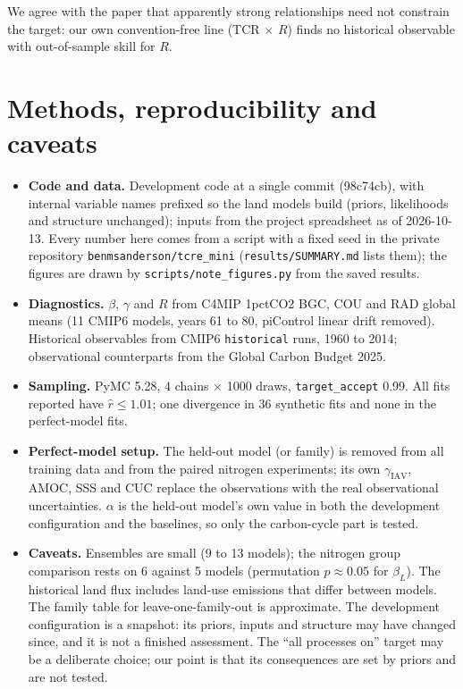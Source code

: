 \documentclass[11pt,a4paper]{article}
\newcommand{\bL}{$\beta_L$}
\begin{document}
We agree with the paper that apparently strong relationships need not constrain the target: our own convention-free line (TCR $\times$ $R$) finds no historical observable with out-of-sample skill for $R$.

\section*{Methods, reproducibility and caveats}

\begin{itemize}
\item \textbf{Code and data.} Development code at a single commit (98c74cb), with internal variable names prefixed so the land models build (priors, likelihoods and structure unchanged); inputs from the project spreadsheet as of 2026-10-13. Every number here comes from a script with a fixed seed in the private repository \texttt{benmsanderson/tcre\_mini} (\texttt{results/SUMMARY.md} lists them); the figures are drawn by \texttt{scripts/note\_figures.py} from the saved results.
\item \textbf{Diagnostics.} $\beta$, $\gamma$ and $R$ from C4MIP 1pctCO2 BGC, COU and RAD global means (11 CMIP6 models, years 61 to 80, piControl linear drift removed). Historical observables from CMIP6 \texttt{historical} runs, 1960 to 2014; observational counterparts from the Global Carbon Budget 2025.
\item \textbf{Sampling.} PyMC 5.28, 4 chains $\times$ 1000 draws, \texttt{target\_accept} 0.99. All fits reported have $\hat r \le 1.01$; one divergence in 36 synthetic fits and none in the perfect-model fits.
\item \textbf{Perfect-model setup.} The held-out model (or family) is removed from all training data and from the paired nitrogen experiments; its own $\gamma_\mathrm{IAV}$, AMOC, SSS and CUC replace the observations with the real observational uncertainties. $\alpha$ is the held-out model's own value in both the development configuration and the baselines, so only the carbon-cycle part is tested.
\item \textbf{Caveats.} Ensembles are small (9 to 13 models); the nitrogen group comparison rests on 6 against 5 models (permutation $p \approx 0.05$ for \bL). The historical land flux includes land-use emissions that differ between models. The family table for leave-one-family-out is approximate. The development configuration is a snapshot: its priors, inputs and structure may have changed since, and it is not a finished assessment. The ``all processes on'' target may be a deliberate choice; our point is that its consequences are set by priors and are not tested.
\end{itemize}



\end{document}
